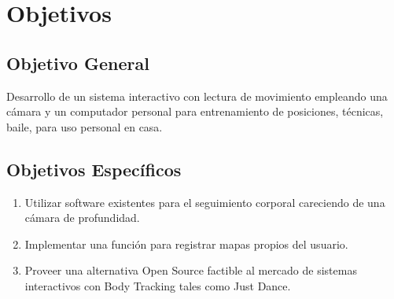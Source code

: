 \chapter{Objetivos}


\section{Objetivo General}

Desarrollo de un sistema interactivo con lectura de movimiento empleando una cámara y un computador personal para entrenamiento de posiciones, técnicas, baile, para uso personal en casa.

\section{Objetivos Específicos}

\begin{enumerate}
	\item Utilizar software existentes para el seguimiento corporal careciendo de una cámara de profundidad.
	\item Implementar una función para registrar mapas propios del usuario.
	\item Proveer una alternativa Open Source factible al mercado de sistemas interactivos con Body Tracking tales como Just Dance.
\end{enumerate}

